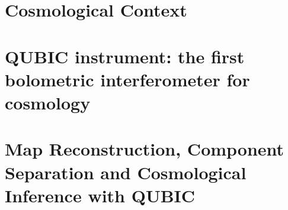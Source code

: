 \documentclass[twoside, 12pt]{book}
\begin{document}
\pagestyle{empty}



\frontmatter
\pagestyle{plain}


\newpage

\newpage
\thispagestyle{empty}
\mbox{}
\newpage

% 

% 

\tableofcontents
\cleardoublepage

\listoffigures
\cleardoublepage

\listoftables
\cleardoublepage


\newpage


\dominitoc
\setcounter{minitocdepth}{2}

\mainmatter
\pagestyle{fancy}
\setlength{\parskip}{.7em}
\renewcommand{\baselinestretch}{1.1}

\fancyhead{}

\clearpage
\fancyhead{}
\fancyhead[RO]{\leftmark}
\fancyhead[LE]{\textsc{\chaptername~\thechapter}}

\part{Cosmological Context}



\part{QUBIC instrument: the first bolometric interferometer for cosmology}







\part{Map Reconstruction, Component Separation and Cosmological Inference with QUBIC} \label{part:MM}
\end{document}
